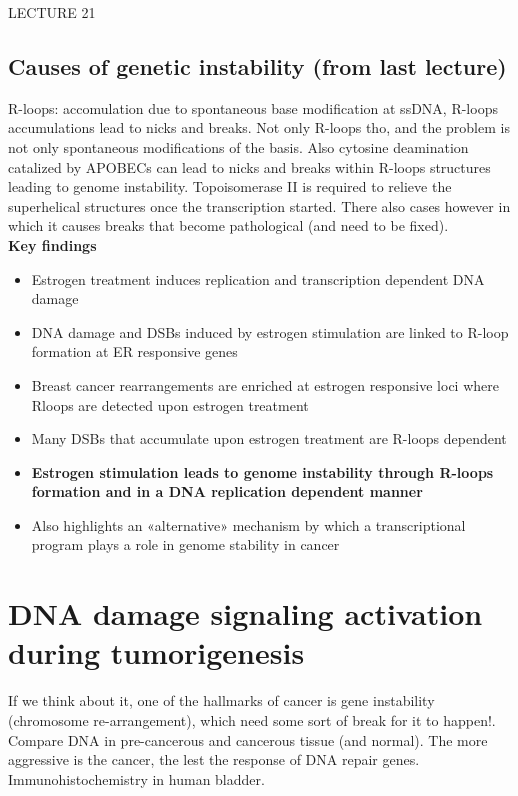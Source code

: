 LECTURE 21

\subsection{Causes of genetic instability (from last lecture)}
R-loops: accomulation due to spontaneous base modification at ssDNA,
R-loops accumulations lead to nicks and breaks. Not only R-loops tho,
and the problem is not only spontaneous modifications of the basis. Also
cytosine deamination catalized by APOBECs can lead to nicks and breaks
within R-loops structures leading to genome instability. Topoisomerase
II is required to relieve the superhelical structures once the
transcription started. There also cases however in which it causes
breaks that become pathological (and need to be fixed).\\

\textbf{Key findings}
\begin{itemize}
\item Estrogen treatment induces replication and transcription
dependent DNA damage
\item DNA damage and DSBs induced by estrogen
stimulation are linked to R-loop formation at ER responsive genes
\item Breast cancer rearrangements are enriched at estrogen responsive loci
where Rloops are detected upon estrogen treatment 
\item Many DSBs that
accumulate upon estrogen treatment are R-loops dependent 
\item \textbf{Estrogen stimulation leads to genome instability through R-loops
formation and in a DNA replication dependent manner} 
\item Also highlights
an «alternative» mechanism by which a transcriptional program plays a
role in genome stability in cancer
\end{itemize} 


\hypertarget{dna-damage-signaling-activation-during-tumorigenesis}{%
\section{DNA damage signaling activation during
tumorigenesis}\label{dna-damage-signaling-activation-during-tumorigenesis}}

If we think about it, one of the hallmarks of cancer is gene instability
(chromosome re-arrangement), which need some sort of break for it to
happen!. Compare DNA in pre-cancerous and cancerous tissue (and normal).
The more aggressive is the cancer, the lest the response of DNA repair
genes. Immunohistochemistry in human bladder.

